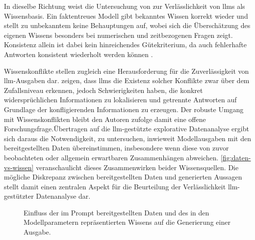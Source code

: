 In dieselbe Richtung weist die Untersuchung von \textcite{zheng_reliable_2024} zur Verlässlichkeit von \glspl{llm} als Wissensbasis. Ein faktentreues Modell gibt bekanntes Wissen korrekt wieder und stellt zu unbekanntem keine Behauptungen auf, wobei sich die Überschätzung des eigenen Wissens besonders bei numerischen und zeitbezogenen Fragen zeigt. Konsistenz allein ist dabei kein hinreichendes Gütekriterium, da auch fehlerhafte Antworten konsistent wiederholt werden können \parencite{zheng_reliable_2024}.

Wissenskonflikte stellen zugleich eine Herausforderung für die Zuverlässigkeit von \gls{llm}-Ausgaben dar. \textcite{wang_resolving_2024} zeigen, dass \glspl{llm} die Existenz solcher Konflikte zwar über dem Zufallsniveau erkennen, jedoch Schwierigkeiten haben, die konkret widersprüchlichen Informationen zu lokalisieren und getrennte Antworten auf Grundlage der konfligierenden Informationen zu erzeugen. Der robuste Umgang mit Wissenskonflikten bleibt den Autoren zufolge damit eine offene Forschungsfrage.Übertragen auf die \gls{llm}-gestützte explorative Datenanalyse ergibt sich daraus die Notwendigkeit, zu untersuchen, inwieweit Modellausgaben mit den bereitgestellten Daten übereinstimmen, insbesondere wenn diese von zuvor beobachteten oder allgemein erwartbaren Zusammenhängen abweichen. \autoref{fig:daten-vs-wissen} veranschaulicht dieses Zusammenwirken beider Wissensquellen. Die mögliche Diskrepanz zwischen bereitgestellten Daten und generierten Aussagen stellt damit einen zentralen Aspekt für die Beurteilung der Verlässlichkeit \gls{llm}-gestützter Datenanalyse dar.
\begin{figure}[htbp]
    \centering
    \caption[Datenbasierte und wissensbasierte Ausgaben]{Einfluss der im Prompt bereitgestellten Daten und des in den Modellparametern repräsentierten Wissens auf die Generierung einer Ausgabe.}
    \label{fig:daten-vs-wissen}
\end{figure}

